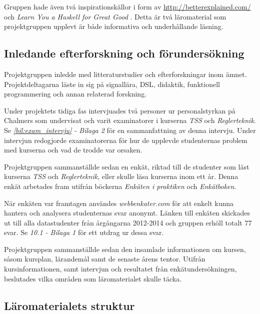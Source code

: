 \documentclass[]{article}
\begin{document}
Gruppen hade även två inspirationskällor i form av
\url{http://betterexplained.com/} och \textit{Learn You a Haskell for Great Good} \cite{learnyouahaskell}.
Detta är två läromaterial som projektgruppen upplevt är både
informativa och underhållande läsning.

\subsection{Inledande efterforskning och förundersökning}

Projektgruppen inledde med litteraturstudier och efterforskningar inom
ämnet. Projektdeltagarna läste in sig på signallära, DSL, didaktik,
funktionell programmering och annan relaterad forskning.

Under projektets tidiga fas intervjuades två personer ur
personalstyrkan på Chalmers som undervisat och varit examinatorer i
kurserna \textit{TSS} och \textit{Reglerteknik}.
Se \textit{\ref{bil:exam_intervju} - Bilaga 2} för en sammanfattning av denna
intervju. Under intervjun redogjorde examinatorerna för hur de
upplevde studenternas problem med kurserna och vad de trodde var
orsaken.

Projektgruppen sammanställde sedan en enkät, riktad till de studenter
som läst kurserna \textit{TSS} och \textit{Reglerteknik}, eller skulle
läsa kurserna inom ett år. Denna enkät arbetades fram utifrån böckerna
\textit{Enkäten i praktiken}\cite{enkaten_i_praktiken} och \textit{Enkätboken}\cite{enkatboken}.

När enkäten var framtagen användes \textit{webbenkater.com} för att
enkelt kunna hantera och analysera studenternas svar anonymt.
Länken till enkäten skickades ut till alla
datastudenter från årgångarna 2012-2014 och gruppen erhöll totalt 77
svar. Se \textit{10.1 - Bilaga 1} för ett utdrag ur dessa svar.

Projektgruppen sammanställde sedan den insamlade informationen om
kursen, såsom kursplan, lärandemål samt de senaste årens
tentor. Utifrån kursinformationen, samt intervjun och resultatet från
enkätundersökningen, beslutades vilka områden som läromaterialet
skulle täcka.

\subsection{Läromaterialets struktur}
\end{document}
